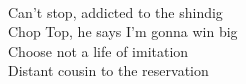 \\
Can't stop, addicted to the shindig \\
Chop Top, he says I'm gonna win big \\
Choose not a life of imitation \\
Distant cousin to the reservation \\
\\

